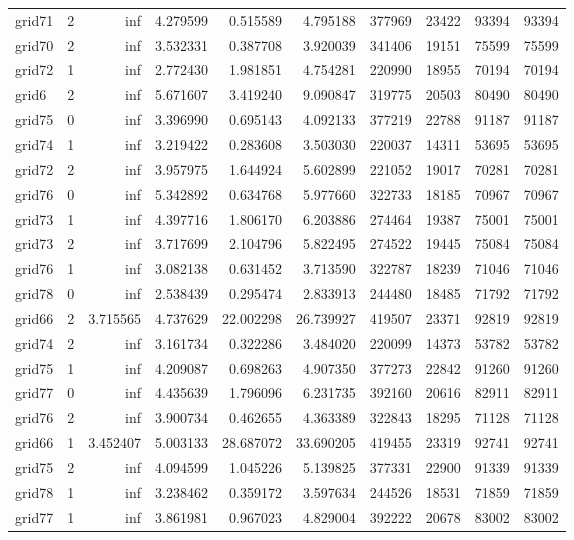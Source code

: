 \begin{longtable}{|l|r|r|r|r|r|r|r|r|r|}
grid71 & 2 & inf & 4.279599 & 0.515589 & 4.795188 & 377969 & 23422 & 93394 & 93394 \\
grid70 & 2 & inf & 3.532331 & 0.387708 & 3.920039 & 341406 & 19151 & 75599 & 75599 \\
grid72 & 1 & inf & 2.772430 & 1.981851 & 4.754281 & 220990 & 18955 & 70194 & 70194 \\
grid6 & 2 & inf & 5.671607 & 3.419240 & 9.090847 & 319775 & 20503 & 80490 & 80490 \\
grid75 & 0 & inf & 3.396990 & 0.695143 & 4.092133 & 377219 & 22788 & 91187 & 91187 \\
grid74 & 1 & inf & 3.219422 & 0.283608 & 3.503030 & 220037 & 14311 & 53695 & 53695 \\
grid72 & 2 & inf & 3.957975 & 1.644924 & 5.602899 & 221052 & 19017 & 70281 & 70281 \\
grid76 & 0 & inf & 5.342892 & 0.634768 & 5.977660 & 322733 & 18185 & 70967 & 70967 \\
grid73 & 1 & inf & 4.397716 & 1.806170 & 6.203886 & 274464 & 19387 & 75001 & 75001 \\
grid73 & 2 & inf & 3.717699 & 2.104796 & 5.822495 & 274522 & 19445 & 75084 & 75084 \\
grid76 & 1 & inf & 3.082138 & 0.631452 & 3.713590 & 322787 & 18239 & 71046 & 71046 \\
grid78 & 0 & inf & 2.538439 & 0.295474 & 2.833913 & 244480 & 18485 & 71792 & 71792 \\
grid66 & 2 & 3.715565 & 4.737629 & 22.002298 & 26.739927 & 419507 & 23371 & 92819 & 92819 \\
grid74 & 2 & inf & 3.161734 & 0.322286 & 3.484020 & 220099 & 14373 & 53782 & 53782 \\
grid75 & 1 & inf & 4.209087 & 0.698263 & 4.907350 & 377273 & 22842 & 91260 & 91260 \\
grid77 & 0 & inf & 4.435639 & 1.796096 & 6.231735 & 392160 & 20616 & 82911 & 82911 \\
grid76 & 2 & inf & 3.900734 & 0.462655 & 4.363389 & 322843 & 18295 & 71128 & 71128 \\
grid66 & 1 & 3.452407 & 5.003133 & 28.687072 & 33.690205 & 419455 & 23319 & 92741 & 92741 \\
grid75 & 2 & inf & 4.094599 & 1.045226 & 5.139825 & 377331 & 22900 & 91339 & 91339 \\
grid78 & 1 & inf & 3.238462 & 0.359172 & 3.597634 & 244526 & 18531 & 71859 & 71859 \\
grid77 & 1 & inf & 3.861981 & 0.967023 & 4.829004 & 392222 & 20678 & 83002 & 83002 \\

\end{longtable}
